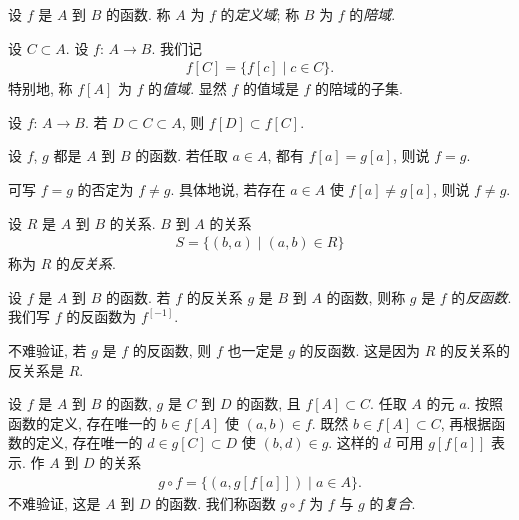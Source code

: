 \begin{definition}
    设 $f$ 是 $A$ 到 $B$ 的函数. 称 $A$ 为 $f$ 的\emph{定义域}; 称 $B$ 为 $f$ 的\emph{陪域}.
\end{definition}

\begin{definition}
    设 $C \subset A$. 设 $f$: $A \to B$. 我们记
    \begin{align*}
        f[C] = \{ f[c] \mid \text{$c \in C$} \}.
    \end{align*}
    特别地, 称 $f[A]$ 为 $f$ 的\emph{值域}. 显然 $f$ 的值域是 $f$ 的陪域的子集.
\end{definition}

\begin{remark}
    设 $f$: $A \to B$. 若 $D \subset C \subset A$, 则 $f[D] \subset f[C]$.
\end{remark}

\begin{definition}
    设 $f$, $g$ 都是 $A$ 到 $B$ 的函数. 若任取 $a \in A$, 都有 $f[a] = g[a]$, 则说 $f = g$.

    可写 $f = g$ 的否定为 $f \neq g$. 具体地说, 若存在 $a \in A$ 使 $f[a] \neq g[a]$, 则说 $f \neq g$.
\end{definition}

\begin{definition}
    设 $R$ 是 $A$ 到 $B$ 的关系. $B$ 到 $A$ 的关系
    \begin{align*}
        S = \{ (b, a) \mid (a, b) \in R \}
    \end{align*}
    称为 $R$ 的\emph{反关系}.
\end{definition}

\begin{definition}
    设 $f$ 是 $A$ 到 $B$ 的函数. 若 $f$ 的反关系 $g$ 是 $B$ 到 $A$ 的函数, 则称 $g$ 是 $f$ 的\emph{反函数}. 我们写 $f$ 的反函数为 $f^{[-1]}$.
\end{definition}

\begin{remark}
    不难验证, 若 $g$ 是 $f$ 的反函数, 则 $f$ 也一定是 $g$ 的反函数. 这是因为 $R$ 的反关系的反关系是 $R$.
\end{remark}

\begin{definition}
    设 $f$ 是 $A$ 到 $B$ 的函数, $g$ 是 $C$ 到 $D$ 的函数, 且 $f[A] \subset C$. 任取 $A$ 的元 $a$. 按照函数的定义, 存在唯一的 $b \in f[A]$ 使 $(a, b) \in f$. 既然 $b \in f[A] \subset C$, 再根据函数的定义, 存在唯一的 $d \in g[C] \subset D$ 使 $(b, d) \in g$. 这样的 $d$ 可用 $g[f[a]]$ 表示. 作 $A$ 到 $D$ 的关系
    \begin{align*}
        g \circ f = \{ (a, g[f[a]]) \mid a \in A \}.
    \end{align*}
    不难验证, 这是 $A$ 到 $D$ 的函数. 我们称函数 $g \circ f$ 为 $f$ 与 $g$ 的\emph{复合}.
\end{definition}

